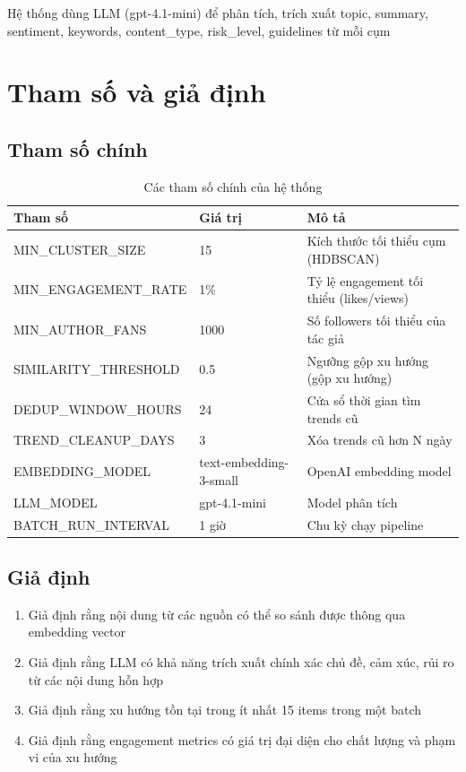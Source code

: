 Hệ thống dùng LLM (gpt-4.1-mini) để phân tích, trích xuất topic, summary, sentiment, keywords, content\_type, risk\_level, guidelines từ mỗi cụm


\section{Tham số và giả định}

\subsection{Tham số chính}

\begin{table}[H]
    \centering
    \begin{tabular}{|l|l|l|}
        \hline
        \textbf{Tham số}      & \textbf{Giá trị}       & \textbf{Mô tả}                           \\
        \hline
        MIN\_CLUSTER\_SIZE    & 15                     & Kích thước tối thiểu cụm (HDBSCAN)       \\
        MIN\_ENGAGEMENT\_RATE & 1\%                    & Tỷ lệ engagement tối thiểu (likes/views) \\
        MIN\_AUTHOR\_FANS     & 1000                   & Số followers tối thiểu của tác giả       \\
        SIMILARITY\_THRESHOLD & 0.5                    & Ngưỡng gộp xu hướng (gộp xu hướng)       \\
        DEDUP\_WINDOW\_HOURS  & 24                     & Cửa sổ thời gian tìm trends cũ           \\
        TREND\_CLEANUP\_DAYS  & 3                      & Xóa trends cũ hơn N ngày                 \\
        EMBEDDING\_MODEL      & text-embedding-3-small & OpenAI embedding model                   \\
        LLM\_MODEL            & gpt-4.1-mini           & Model phân tích                          \\
        BATCH\_RUN\_INTERVAL  & 1 giờ                  & Chu kỳ chạy pipeline                     \\
        \hline
    \end{tabular}
    \caption{Các tham số chính của hệ thống}
    \label{table:parameters}
\end{table}

\subsection{Giả định}

\begin{enumerate}
    \item Giả định rằng nội dung từ các nguồn có thể so sánh được thông qua embedding vector
    \item Giả định rằng LLM có khả năng trích xuất chính xác chủ đề, cảm xúc, rủi ro từ các nội dung hỗn hợp
    \item Giả định rằng xu hướng tồn tại trong ít nhất 15 items trong một batch
    \item Giả định rằng engagement metrics có giá trị đại diện cho chất lượng và phạm vi của xu hướng
\end{enumerate}

